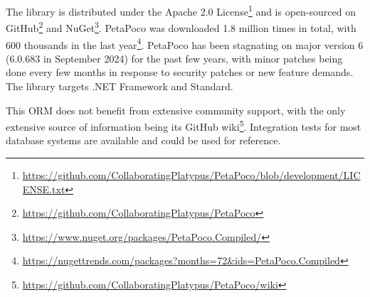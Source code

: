 The library is distributed under the Apache 2.0 License\footnote{\url{https://github.com/CollaboratingPlatypus/PetaPoco/blob/development/LICENSE.txt}} and is open-sourced on GitHub\footnote{\url{https://github.com/CollaboratingPlatypus/PetaPoco}} and NuGet\footnote{\url{https://www.nuget.org/packages/PetaPoco.Compiled/}}. PetaPoco was downloaded 1.8 million times in total, with 600 thousands in the last year\footnote{\url{https://nugettrends.com/packages?months=72&ids=PetaPoco.Compiled}}. PetaPoco has been stagnating on major version 6 (6.0.683 in September 2024) for the past few years, with minor patches being done every few months in response to security patches or new feature demands. The library targets .NET Framework and Standard.

This ORM does not benefit from extensive community support, with the only extensive source of information being its GitHub wiki\footnote{\url{https://github.com/CollaboratingPlatypus/PetaPoco/wiki}}. Integration tests for most database systems are available and could be used for reference.


